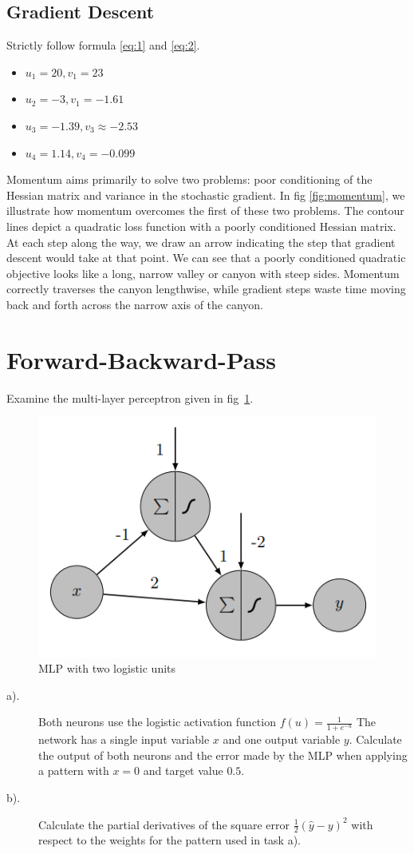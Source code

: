 \documentclass[12pt]{article}
\providecommand{\tightlist}{%
	\setlength{\itemsep}{0pt}\setlength{\parskip}{0pt}}
\begin{document}
\subsection{Gradient Descent}

Strictly follow formula \ref{eq:1} and \ref{eq:2}.

\begin{itemize}
	\tightlist
	\item $u_1=20, v_1=23$
	\item $u_2=-3, v_1=-1.61$
	\item $u_3=-1.39, v_3\approx -2.53$
	\item $u_4=1.14,v_4=-0.099$
\end{itemize}

Momentum aims primarily to solve two problems: poor conditioning of the Hessian matrix and variance in the stochastic gradient. In fig \ref{fig:momentum}, we illustrate how momentum overcomes the first of these two problems. The contour lines depict a quadratic loss function with a poorly conditioned Hessian matrix.  At each step along the way, we draw an arrow indicating the step that gradient descent would take at that point. We can see that a poorly conditioned quadratic objective looks like a long, narrow valley or canyon with steep sides. Momentum correctly traverses the canyon lengthwise, while gradient steps waste time moving back and forth across the narrow axis of the canyon.

\section{Forward-Backward-Pass}
Examine the multi-layer perceptron given in fig~\ref{fig:mlp}.

\begin{figure}[!htbp]
	\centering
	\includegraphics[width=.5\textwidth]{fig/2018-03-19-13-49-49.png}
	\caption{MLP with two logistic units} \label{fig:mlp}
\end{figure}

\begin{description}
	\item[a).]	Both neurons use the logistic activation function
	      $f(u)=\frac{1}{1+e^{-u}}$
	      The network has
	      a single input variable $x$ and one output variable $y$. Calculate the output of both
	      neurons and the error made by the MLP when applying a pattern with $x = 0$ and
	      target value $0.5$.
	\item[b).] Calculate the partial derivatives of the
	      square error $\frac{1}{2}(\hat{y} -y)^2$
	      with respect to the weights for the pattern used in task a).
\end{description}
\end{document}
